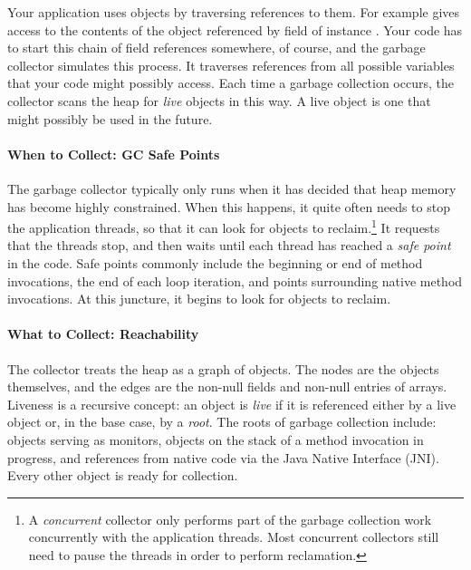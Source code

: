 Your application uses objects by traversing references to them. For example
  gives access to the contents of the object referenced by field
 of instance . Your code has to start this chain of field
references somewhere, of course, and the garbage collector simulates this
process. It traverses references from all possible variables that your code
might possibly access. Each time a garbage collection occurs, the collector
scans the heap for \emph{live} objects in this way. A live object is one that
might possibly be used in the future.

\paragraph{When to Collect: GC Safe Points}
The garbage collector typically only runs when it has decided that heap memory
has become highly constrained. When this happens, it quite often needs to stop
the application threads, so that it can look for objects to reclaim.\footnote{A
\emph{concurrent} collector only performs part of the garbage collection work
concurrently with the application threads. Most concurrent collectors still need
to pause the threads in order to perform reclamation.} It requests that the threads stop, and then waits until each thread
has reached a \emph{safe point} in the code. Safe points commonly include the
beginning or end of method invocations, the end of each loop iteration, and
points surrounding native method invocations. At this juncture, it begins to
look for objects to reclaim.

\paragraph{What to Collect: Reachability}
The collector treats the heap as a graph of objects. The nodes are the objects
themselves, and the edges are the non-null fields and non-null entries of
arrays.  Liveness is a recursive concept: an
object is \emph{live} if it is referenced either by a live object or, in the
base case, by a \emph{root}. The roots of garbage collection include: objects
serving as monitors, objects on the stack of a method invocation in progress,
and references from native code via the Java Native Interface (JNI). Every other
object is ready for collection.

